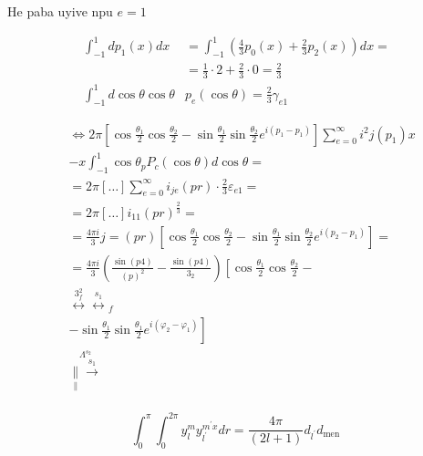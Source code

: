 \documentclass[10pt]{article}
\begin{document}
He paba uyive npu \(e=1\)

\[
\begin{aligned}
\int_{-1}^{1} d p_{1}(x) d x & =\int_{-1}^{1}\left(\frac{4}{3} p_{0}(x)+\frac{2}{3} p_{2}(x)\right) d x= \\
& =\frac{1}{3} \cdot 2+\frac{2}{3} \cdot 0=\frac{2}{3} \\
\int_{-1}^{1} d \cos \theta \cos \theta & p_{e}(\cos \theta)=\frac{2}{3} \gamma_{e 1}
\end{aligned}
\]

\[
\begin{aligned}
& \Leftrightarrow 2 \pi\left[\cos \frac{\theta_{1}}{2} \cos \frac{\theta_{2}}{2}-\sin \frac{\theta_{1}}{2} \sin \frac{\theta_{2}}{2} e^{i\left(p_{1}-p_{1}\right)}\right] \sum_{e=0}^{\infty} i^{2} j\left(p_{1}\right) x \\
& -x \int_{-1}^{1} \cos \theta_{p} P_{c}(\cos \theta) d \cos \theta= \\
& =2 \pi[\ldots] \sum_{e=0}^{\infty} i_{j e}(p r) \cdot \frac{2}{3} \varepsilon_{e 1}= \\
& =2 \pi[\ldots] i_{11}(p r)^{\frac{2}{3}}= \\
& =\frac{4 \pi i}{3} j=(p r)\left[\cos \frac{\theta_{1}}{2} \cos \frac{\theta_{2}}{2}-\sin \frac{\theta_{1}}{2} \sin \frac{\theta_{2}}{2} e^{i\left(p_{2}-p_{1}\right)}\right]= \\
& =\frac{4 \pi i}{3}\left(\frac{\sin (p 4)}{(p)^{2}}-\frac{\sin (p 4)}{3_{2}}\right)\left[\cos \frac{\theta_{1}}{2} \cos \frac{\theta_{2}}{2}-\right. \\
& \stackrel{3_{f}^{2}}{\longleftrightarrow} \stackrel{s_{1}}{\longleftrightarrow}{ }_{f} \\
& \left.-\sin \frac{\theta_{1}}{2} \sin \frac{\theta_{1}}{2} e^{i\left(\varphi_{2}-\varphi_{1}\right)}\right] \\
& \stackrel{\Lambda^{s_{2}}}{\underset{\|}{\|} \xrightarrow{s_{1}}} \\
& \text {  }
\end{aligned}
\]

\[
\int_{0}^{\pi} \int_{0}^{2 \pi} y_{l}^{m} y_{l^{\prime}}^{m^{\prime} x} d r=\frac{4 \pi}{(2 l+1)} d_{l^{\prime}} d_{\text {men }}
\]
\end{document}
